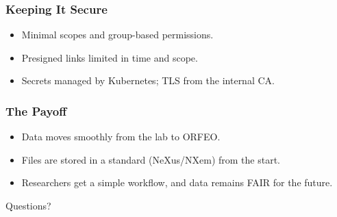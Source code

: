 \documentclass{beamer}
\begin{document}
	\begin{frame}
		\frametitle{Keeping It Secure}
		\begin{itemize}
			\item Minimal scopes and group-based permissions.
			\item Presigned links limited in time and scope.
			\item Secrets managed by Kubernetes; TLS from the internal CA.
		\end{itemize}
	\end{frame}
	
	\begin{frame}
		\frametitle{The Payoff}
		\begin{itemize}
			\item Data moves smoothly from the lab to ORFEO.
			\item Files are stored in a standard (NeXus/NXem) from the start.
			\item Researchers get a simple workflow, and data remains FAIR for the future.
		\end{itemize}
	\end{frame}
	
	\begin{frame}
		\centering
		\Large Questions?
	\end{frame}
	
\end{document}
